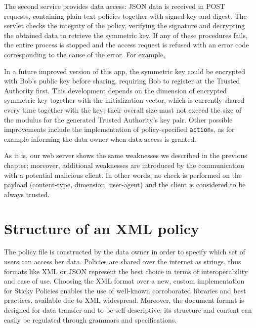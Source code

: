 The second service provides data access: JSON data is received in POST requests, containing plain text policies together with signed key and digest. The servlet checks the integrity of the policy, verifying the signature and decrypting the obtained data to retrieve the symmetric key. If any of these procedures fails, the entire process is stopped and the access request is refused with an error code corresponding to the cause of the error. For example,


In a future improved version of this app, the symmetric key could be encrypted with Bob's public key before sharing, requiring Bob to register at the Trusted Authority first. This development depends on the dimension of encrypted symmetric key together with the initialization vector, which is currently shared every time together with the key; their overall size must not exceed the size of the modulus for the generated Trusted Authority's key pair. Other possible improvements include the implementation of policy-specified \texttt{action}s, as for example informing the data owner when data access is granted.

As it is, our web server shows the same weaknesses we described in the previous chapter; moreover, additional weaknesses are introduced by the communication with a potential malicious client. In other words, no check is performed on the payload (content-type, dimension, user-agent) and the client is considered to be always trusted.

\section{Structure of an XML policy}
The policy file is constructed by the data owner in order to specify which set of users can access her data. Policies are shared over the internet as strings, thus formats like XML or JSON represent the best choice in terms of interoperability and ease of use. Choosing the XML format over a new, custom implementation for Sticky Policies enables the use of well-known corroborated libraries and best practices, available due to XML widespread. Moreover, the document format is designed for data transfer and to be self-descriptive: its structure and content can easily be regulated through grammars and specifications.

